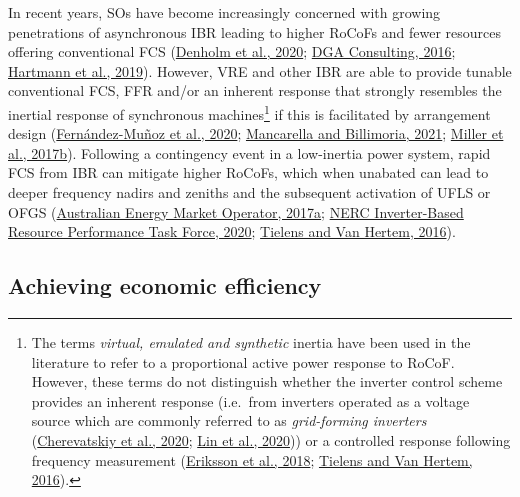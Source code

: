 \documentclass[12pt,a4paper,]{report}
\begin{document}
In recent years, SOs have become increasingly concerned with growing
penetrations of asynchronous IBR leading to higher RoCoFs and fewer
resources offering conventional FCS
(\protect\hyperlink{ref-denholmInertiaPowerGrid2020}{Denholm et al.,
2020};
\protect\hyperlink{ref-dgaconsultingInternationalReviewFrequency2016}{DGA
Consulting, 2016};
\protect\hyperlink{ref-hartmannEffectsDecreasingSynchronous2019}{Hartmann
et al., 2019}). However, VRE and other IBR are able to provide tunable
conventional FCS, FFR and/or an inherent response that strongly
resembles the inertial response of synchronous machines\footnote{The
  terms \emph{virtual, emulated and synthetic} inertia have been used in
  the literature to refer to a proportional active power response to
  RoCoF. However, these terms do not distinguish whether the inverter
  control scheme provides an inherent response (i.e.~from inverters
  operated as a voltage source which are commonly referred to as
  \emph{grid-forming inverters}
  (\protect\hyperlink{ref-cherevatskiyGridFormingEnergy2020}{Cherevatskiy
  et al., 2020};
  \protect\hyperlink{ref-linResearchRoadmapGridForming2020}{Lin et al.,
  2020})) or a controlled response following frequency measurement
  (\protect\hyperlink{ref-erikssonSyntheticInertiaFast2018}{Eriksson et
  al., 2018};
  \protect\hyperlink{ref-tielensRelevanceInertiaPower2016}{Tielens and
  Van Hertem, 2016}).} if this is facilitated by arrangement design
(\protect\hyperlink{ref-fernandez-munozFastFrequencyControl2020}{Fernández-Muñoz
et al., 2020};
\protect\hyperlink{ref-mancarellaFragileGridPhysics2021}{Mancarella and
Billimoria, 2021};
\protect\hyperlink{ref-millerTechnologyCapabilitiesFast2017}{Miller et
al., 2017b}). Following a contingency event in a low-inertia power
system, rapid FCS from IBR can mitigate higher RoCoFs, which when
unabated can lead to deeper frequency nadirs and zeniths and the
subsequent activation of UFLS or OFGS
(\protect\hyperlink{ref-australianenergymarketoperatorFastFrequencyResponse2017}{Australian
Energy Market Operator, 2017a};
\protect\hyperlink{ref-nercinverter-basedresourceperformancetaskforceFastFrequencyResponse2020}{NERC
Inverter-Based Resource Performance Task Force, 2020};
\protect\hyperlink{ref-tielensRelevanceInertiaPower2016}{Tielens and Van
Hertem, 2016}).

\hypertarget{sec:fcs-efficiency-challenges}{%
\subsection{Achieving economic
efficiency}\label{sec:fcs-efficiency-challenges}}
\end{document}
